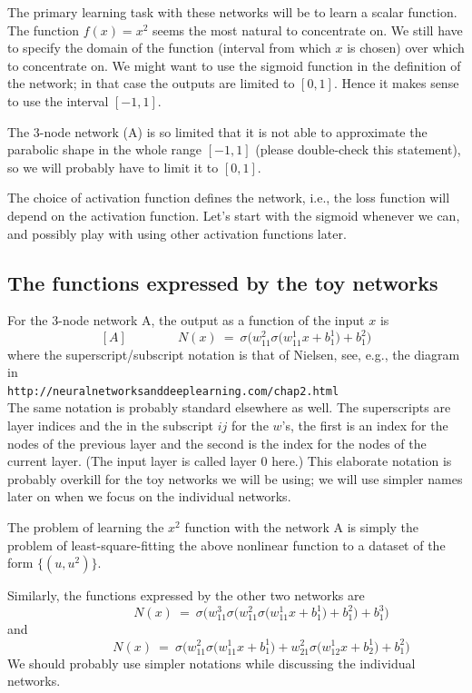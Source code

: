 \documentclass[12pt,a4paper]{article}
\begin{document}
The primary learning task with these networks will be to learn a scalar function.  The function
$f(x) = x^2$ seems the most natural to concentrate on.  We still have to specify the domain of the
function (interval from which $x$ is chosen) over which to concentrate on.  We might want to use the
sigmoid function in the definition of the network; in that case the outputs are limited to $[0,1]$.
Hence it makes sense to use the interval $[-1,1]$.

The 3-node network (A) is so limited that it is not able to approximate the parabolic shape in the
whole range $[-1,1]$ (please double-check this statement), so we will probably have to limit it to
$[0,1]$.

The choice of activation function defines the network, i.e., the loss function will depend on the
activation function.  Let's start with the sigmoid whenever we can, and possibly play with using
other activation functions later.


\subsection{The functions expressed by the toy networks} 


For the 3-node network A, the output as a function of the input $x$ is
\begin{equation} \label{eq_intro_3node_function}
[A]  \qquad \qquad N(x) ~=~  \sigma\Big( w^2_{11} \sigma\big(w^1_{11}x+b^1_1\big) +b^2_1 \Big)
\end{equation}
where the superscript/subscript notation is that of Nielsen, see, e.g., the diagram in
%
\\ {\tt http://neuralnetworksanddeeplearning.com/chap2.html}
%
\\ The same notation is probably standard elsewhere as well.  The superscripts are layer indices and
the in the subscript $ij$ for the $w$'s, the first is an index for the nodes of the previous layer
and the second is the index for the nodes of the current layer.  (The input layer is called layer 0
here.)  This elaborate notation is probably overkill for the toy networks we will be using; we will
use simpler names later on when we focus on the individual networks.

The problem of learning the $x^2$ function with the network A is simply the problem of
least-square-fitting the above nonlinear function to a dataset of the form $\{(u,u^2)\}$. 

Similarly, the functions expressed by the other two networks are 
\begin{equation} 
[B]  \qquad \qquad N(x) ~=~   \sigma\Bigg( w^3_{11} \sigma\Big( w^2_{11} \sigma\big(w^1_{11}x+b^1_1\big) +b^2_1 \Big) +b^3_1 \Bigg)
\end{equation}
and 
\begin{equation} 
  [C]  \qquad \qquad
N(x) ~=~  \sigma\Big( w^2_{11} \sigma\big(w^1_{11}x+b^1_1\big) + w^2_{21} \sigma\big(w^1_{12}x+b^1_2\big) +b^2_1 \Big)  
\end{equation}
%
We should probably use simpler notations while discussing the individual networks.  
\end{document}
